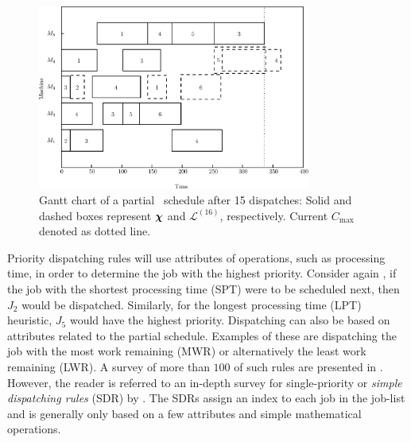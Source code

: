 \documentclass[smallextended]{svjour3}
\begin{document}
\begin{figure}[t!]\centering
	\includegraphics[width=0.8\textwidth]{figures/jssp_example_nocolor}
	\caption[Gantt chart of a partial \JSP~schedule]{Gantt chart of a
		partial \JSP~schedule after 15 dispatches: Solid and dashed boxes
		represent $\bm \chi$ and $\mathcal{L}^{(16)}$, respectively. Current
		$C_{\max}$ denoted as dotted line.}
	\label{fig:jssp:example}
\end{figure}




Priority dispatching rules will use attributes of operations, such as processing time, 
in order to determine the job with the highest priority. 
Consider again , if the job with the shortest processing 
time (SPT) were to be scheduled next, then $J_2$ would be dispatched. 
Similarly, for the longest processing time (LPT) heuristic, $J_5$ would have the highest priority. 
Dispatching can also be based on attributes related to the partial schedule. 
Examples of these are dispatching the job with the most work remaining (MWR) or 
alternatively the least work remaining (LWR). A survey of more than $100$ of 
such rules are presented in \cite{Panwalkar77}. 
However, the reader is referred to an in-depth survey for single-priority or 
\emph{simple dispatching rules} (SDR) by \cite{Haupt89}.  
The SDRs assign an index to each job in the job-list and is generally only based on a
few attributes and simple mathematical operations.
\end{document}
